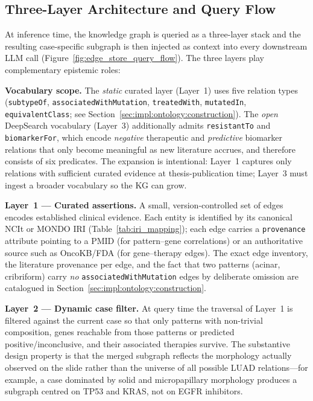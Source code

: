 \subsection{Three-Layer Architecture and Query Flow}
\label{sec:meth:ontology:layers}
\label{sec:meth:ontology:sparql}

At inference time, the knowledge graph is queried as a three-layer
stack and the resulting case-specific subgraph is then injected as
context into every downstream LLM call
(Figure~\ref{fig:edge_store_query_flow}).
The three layers play complementary epistemic roles:

\textbf{Vocabulary scope.}
The \emph{static} curated layer (Layer~1) uses five relation types
(\texttt{subtypeOf}, \texttt{associatedWithMutation},
\texttt{treatedWith}, \texttt{mutatedIn}, \texttt{equivalentClass};
see Section~\ref{sec:impl:ontology:construction}).
The \emph{open} DeepSearch vocabulary (Layer~3) additionally admits
\texttt{resistantTo} and \texttt{biomarkerFor}, which encode
\emph{negative} therapeutic and \emph{predictive} biomarker relations
that only become meaningful as new literature accrues, and therefore
consists of six predicates.
The expansion is intentional: Layer~1 captures only relations with
sufficient curated evidence at thesis-publication time; Layer~3 must
ingest a broader vocabulary so the KG can grow.

\textbf{Layer~1 --- Curated assertions.}
A small, version-controlled set of edges encodes established clinical
evidence. Each entity is identified by its canonical NCIt or MONDO
IRI (Table~\ref{tab:iri_mapping}); each edge carries a
\texttt{provenance} attribute pointing to a PMID (for pattern--gene
correlations) or an authoritative source such as OncoKB/FDA (for
gene--therapy edges).
The exact edge inventory, the literature provenance per edge, and the
fact that two patterns (acinar, cribriform) carry \emph{no}
\texttt{associatedWithMutation} edges by deliberate omission are
catalogued in Section~\ref{sec:impl:ontology:construction}.

\textbf{Layer~2 --- Dynamic case filter.}
At query time the traversal of Layer~1 is filtered against the
current case so that only patterns with non-trivial composition,
genes reachable from those patterns or predicted
positive/inconclusive, and their associated therapies survive.
The substantive design property is that the merged subgraph reflects
the morphology actually observed on the slide rather than the
universe of all possible LUAD relations---for example, a case
dominated by solid and micropapillary morphology produces a subgraph
centred on TP53 and KRAS, not on EGFR inhibitors.

